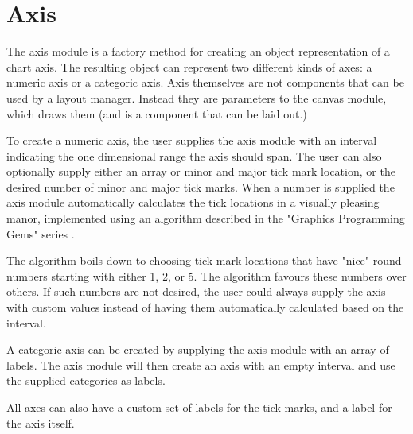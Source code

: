 \section{Axis}
The axis module is a factory method for creating an object representation of a chart axis. The resulting object can represent two different kinds of axes: a numeric axis or a categoric axis. Axis themselves are not components that can be used by a layout manager. Instead they are parameters to the canvas module, which draws them (and is a component that can be laid out.) 

To create a numeric axis, the user supplies the axis module with an interval indicating the one dimensional range the axis should span. The user can also optionally supply either an array or minor and major tick mark location, or the desired number of minor and major tick marks.  When a number is supplied the axis module automatically calculates the tick locations in a visually pleasing manor, implemented using an algorithm described in the "Graphics Programming Gems" series \cite{heckbert90}. 

The algorithm boils down to choosing tick mark locations that have "nice" round numbers starting with either 1, 2, or 5. The algorithm favours these numbers over others. If such numbers are not desired, the user could always supply the axis with custom values instead of having them automatically calculated based on the interval.

A categoric axis can be created by supplying the axis module with an array of labels. The axis module will then create an axis with an empty interval and use the supplied categories as labels.

All axes can also have a custom set of labels for the tick marks, and a label for the axis itself.
